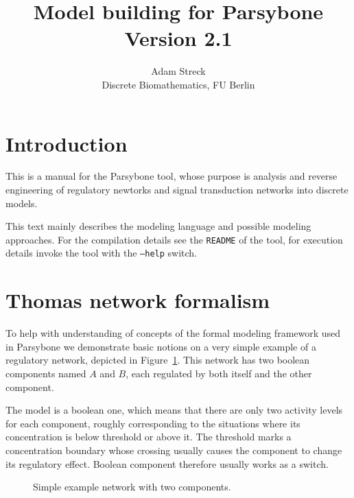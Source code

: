 \documentclass[12pt]{article}
\title{Model building for Parsybone \\ Version 2.1}
\author{Adam Streck \\
		Discrete Biomathematics, FU Berlin}
\begin{document}
\maketitle

\tableofcontents
\clearpage

\section{Introduction}
\label{sec:introduction}
This is a manual for the Parsybone tool, whose purpose is analysis and reverse engineering of regulatory newtorks and signal transduction networks into discrete models.

This text mainly describes the modeling language and possible modeling approaches. For the compilation details see the \texttt{README} of the tool, for execution details invoke the tool with the \texttt{--help} switch. 

\section{Thomas network formalism}
\label{sec:thomas_network}
To help with understanding of concepts of the formal modeling framework used in Parsybone we demonstrate basic notions on a very simple example of a regulatory network, depicted in Figure~\ref{ExampNet}. This network has two boolean components named $A$ and $B$, each regulated by both itself and the other component.

The model is a boolean one, which means that there are only two activity levels for each component, roughly corresponding to the situations where its concentration is below threshold or above it. The threshold marks a concentration boundary whose crossing usually causes the component to change its regulatory effect. Boolean component therefore usually works as a switch.

\begin{figure}[b]
\centering
{}
\caption{Simple example network with two components.}
\label{ExampNet}
\end{figure}
\end{document}
